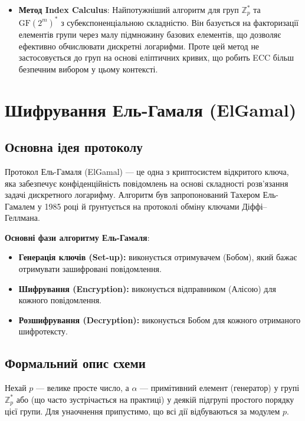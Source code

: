 \documentclass[12pt]{report}
\theoremstyle{definition}
\theoremstyle{plain}
\begin{document}
\begin{itemize}
    \item \textbf{Метод Index Calculus}: Найпотужніший алгоритм для груп \( \mathbb{Z}^*_p \) та \( \text{GF}(2^m)^* \) з субекспоненціальною складністю. Він базується на факторизації елементів групи через малу підмножину базових елементів, що дозволяє ефективно обчислювати дискретні логарифми. Проте цей метод не застосовується до груп на основі еліптичних кривих, що робить ECC більш безпечним вибором у цьому контексті.
\end{itemize}

\chapter{Шифрування Ель-Гамаля (ElGamal)}

\section{Основна ідея протоколу}

Протокол Ель-Гамаля (ElGamal) — це одна з криптосистем відкритого ключа, яка забезпечує конфіденційність повідомлень на основі складності розв’язання задачі дискретного логарифму. Алгоритм був запропонований Тахером Ель-Гамалем у 1985 році й ґрунтується на протоколі обміну ключами Діффі–Геллмана.

\textbf{Основні фази алгоритму Ель-Гамаля}: 
\begin{itemize}
    \item \textbf{Генерація ключів (Set-up):} виконується отримувачем (Бобом), який бажає отримувати зашифровані повідомлення.
    \item \textbf{Шифрування (Encryption):} виконується відправником (Алісою) для кожного повідомлення.
    \item \textbf{Розшифрування (Decryption):} виконується Бобом для кожного отриманого шифротексту.
\end{itemize}

\section{Формальний опис схеми}

Нехай \(p\) — велике просте число, а \(\alpha\) — примітивний елемент (генератор) у групі \(\mathbb{Z}_p^*\) або (що часто зустрічається на практиці) у деякій підгрупі простого порядку цієї групи. Для унаочнення припустимо, що всі дії відбуваються за модулем \(p\).
\end{document}
